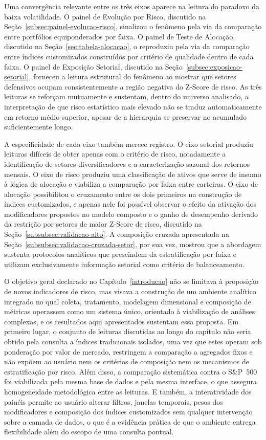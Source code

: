 Uma convergência relevante entre os três eixos aparece na leitura do paradoxo da baixa volatilidade. O painel de Evolução por Risco, discutido na Seção~\ref{subsec:painel-evolucao-risco}, sinalizou o fenômeno pela via da comparação entre portfólios equiponderados por faixa. O painel de Teste de Alocação, discutido na Seção~\ref{sec:tabela-alocacao}, o reproduziu pela via da comparação entre índices customizados construídos por critério de qualidade dentro de cada faixa. O painel de Exposição Setorial, discutido na Seção~\ref{subsec:exposicao-setorial}, forneceu a leitura estrutural do fenômeno ao mostrar que setores defensivos ocupam consistentemente a região negativa do Z-Score de risco. As três leituras se reforçam mutuamente e sustentam, dentro do universo analisado, a interpretação de que risco estatístico mais elevado não se traduz automaticamente em retorno médio superior, apesar de a hierarquia se preservar no acumulado suficientemente longo.

A especificidade de cada eixo também merece registro. O eixo setorial produziu leituras difíceis de obter apenas com o critério de risco, notadamente a identificação de setores diversificadores e a caracterização sazonal dos retornos mensais. O eixo de risco produziu uma classificação de ativos que serve de insumo à lógica de alocação e viabiliza a comparação por faixa entre carteiras. O eixo de alocação possibilitou o cruzamento entre os dois primeiros na construção de índices customizados, e apenas nele foi possível observar o efeito da ativação dos modificadores propostos no modelo composto e o ganho de desempenho derivado da restrição por setores de maior Z-Score de risco, discutido na Seção~\ref{subsubsec:validacao-alto}. A composição cruzada apresentada na Seção~\ref{subsubsec:validacao-cruzada-setor}, por sua vez, mostrou que a abordagem sustenta protocolos analíticos que prescindem da estratificação por faixa e utilizam exclusivamente informação setorial como critério de balanceamento.

O objetivo geral declarado no Capítulo~\ref{introducao} não se limitava à proposição de novos indicadores de risco, mas visava a construção de um ambiente analítico integrado no qual coleta, tratamento, modelagem dimensional e composição de métricas operassem como um sistema único, orientado à viabilização de análises complexas, e os resultados aqui apresentados sustentam essa proposta. Em primeiro lugar, o conjunto de leituras discutidas ao longo do capítulo não seria obtido pela consulta a índices tradicionais isolados, uma vez que estes operam sob ponderação por valor de mercado, restringem a comparação a agregados fixos e não expõem ao usuário nem os critérios de composição nem os mecanismos de estratificação por risco. Além disso, a comparação sistemática contra o S\&P~500 foi viabilizada pela mesma base de dados e pela mesma interface, o que assegura homogeneidade metodológica entre as leituras. E também, a interatividade dos painéis permite ao usuário alterar filtros, janelas temporais, pesos dos modificadores e composição dos índices customizados sem qualquer intervenção sobre a camada de dados, o que é a evidência prática de que o ambiente entrega flexibilidade além do escopo de uma consulta pontual.

